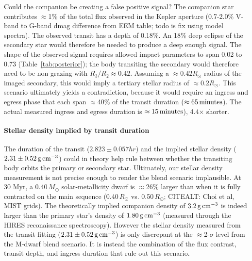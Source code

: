 \documentclass[12pt,modern,tighten]{aastex63}
\begin{document}
Could the companion be creating a false positive signal?  The
companion star contributes $\approx$1\% of the total flux observed in
the Kepler aperture (0.7-2.0\% V-band to G-band dmag difference from
EEM table; todo is fix using model spectra).  The observed transit has
a depth of 0.18\%.  An 18\% deep eclipse of the secondary star would
therefore be needed to produce a deep enough signal.  The shape of the
observed signal requires allowed impact parameters to span 0.02 to
0.73 (Table~\ref{tab:posterior}); the body transiting the secondary
would therefore need to be non-grazing with $R_3/R_2 \approx 0.42$.
Assuming a $\approx 0.42R_\odot$ radius of the imaged secondary, this
would imply a tertiary stellar radius of $\approx 0.2R_\odot$.  This
scenario ultimately yields a contradiction, because it would require
an ingress and egress phase that each span $\approx$40\% of the
transit duration ($\approx 65\,{\rm minutes}$).  The actual measured
ingress and egress duration is $\approx 15\,{\rm minutes}$),
4.4$\times$ shorter.

\paragraph{Stellar density implied by transit duration}
The duration of the transit ($2.823 \pm 0.057 hr$) and the implied
stellar density ($2.31 \pm 0.52\,{\rm g\,cm}^{-3}$) could in theory
help rule between whether the transiting body orbits the primary or
secondary star.  Ultimately, our stellar density measurement is not
precise enough to render the blend scenario implausible.  At 30 Myr, a
0.40\,$M_\odot$ solar-metallicity dwarf is $\approx 26\%$ larger than
when it is fully contracted on the main sequence (0.40\,$R_\odot$
vs{.} 0.50\,$R_\odot$; CITEALT: Choi et al, MIST grids).  The
theoretically implied companion density of $3.2\,{\rm g\,cm}^{-3}$ is
indeed larger than the primary star's density of $1.80\,{\rm
g\,cm}^{-3}$ (measured through the HIRES reconaissance spectroscopy).
However the stellar density measured from the transit fitting ($2.31
\pm 0.52\,{\rm g\,cm}^{-3}$) is only discrepant at the
$\approx$2-$\sigma$ level from the M-dwarf blend scenario.  It is
instead the combination of the flux contrast, transit depth, and
ingress duration that rule out this scenario.









% 


\listofchanges

\end{document}
